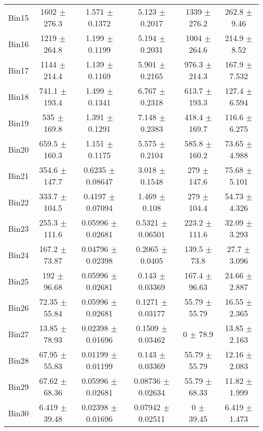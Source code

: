\begin{tabular}{@{\extracolsep{4pt}}lccccc@{}}
     Bin15 & 1602 $\pm$ 276.3 & 1.571 $\pm$ 0.1372 & 5.123 $\pm$ 0.2017 & 1339 $\pm$ 276.2 & 262.8 $\pm$ 9.46 \\ 
     Bin16 & 1219 $\pm$ 264.8 & 1.199 $\pm$ 0.1199 & 5.194 $\pm$ 0.2031 & 1004 $\pm$ 264.6 & 214.9 $\pm$ 8.52 \\ 
     Bin17 & 1144 $\pm$ 214.4 & 1.139 $\pm$ 0.1169 & 5.901 $\pm$ 0.2165 & 976.3 $\pm$ 214.3 & 167.9 $\pm$ 7.532 \\ 
     Bin18 & 741.1 $\pm$ 193.4 & 1.499 $\pm$ 0.1341 & 6.767 $\pm$ 0.2318 & 613.7 $\pm$ 193.3 & 127.4 $\pm$ 6.594 \\ 
     Bin19 & 535 $\pm$ 169.8 & 1.391 $\pm$ 0.1291 & 7.148 $\pm$ 0.2383 & 418.4 $\pm$ 169.7 & 116.6 $\pm$ 6.275 \\ 
     Bin20 & 659.5 $\pm$ 160.3 & 1.151 $\pm$ 0.1175 & 5.575 $\pm$ 0.2104 & 585.8 $\pm$ 160.2 & 73.65 $\pm$ 4.988 \\ 
     Bin21 & 354.6 $\pm$ 147.7 & 0.6235 $\pm$ 0.08647 & 3.018 $\pm$ 0.1548 & 279 $\pm$ 147.6 & 75.68 $\pm$ 5.101 \\ 
     Bin22 & 333.7 $\pm$ 104.5 & 0.4197 $\pm$ 0.07094 & 1.469 $\pm$ 0.108 & 279 $\pm$ 104.4 & 54.73 $\pm$ 4.326 \\ 
     Bin23 & 255.3 $\pm$ 111.6 & 0.05996 $\pm$ 0.02681 & 0.5321 $\pm$ 0.06501 & 223.2 $\pm$ 111.6 & 32.09 $\pm$ 3.293 \\ 
     Bin24 & 167.2 $\pm$ 73.87 & 0.04796 $\pm$ 0.02398 & 0.2065 $\pm$ 0.0405 & 139.5 $\pm$ 73.8 & 27.7 $\pm$ 3.096 \\ 
     Bin25 & 192 $\pm$ 96.68 & 0.05996 $\pm$ 0.02681 & 0.143 $\pm$ 0.03369 & 167.4 $\pm$ 96.63 & 24.66 $\pm$ 2.887 \\ 
     Bin26 & 72.35 $\pm$ 55.84 & 0.05996 $\pm$ 0.02681 & 0.1271 $\pm$ 0.03177 & 55.79 $\pm$ 55.79 & 16.55 $\pm$ 2.365 \\ 
     Bin27 & 13.85 $\pm$ 78.93 & 0.02398 $\pm$ 0.01696 & 0.1509 $\pm$ 0.03462 & 0 $\pm$ 78.9 & 13.85 $\pm$ 2.163 \\ 
     Bin28 & 67.95 $\pm$ 55.83 & 0.01199 $\pm$ 0.01199 & 0.143 $\pm$ 0.03369 & 55.79 $\pm$ 55.79 & 12.16 $\pm$ 2.083 \\ 
     Bin29 & 67.62 $\pm$ 68.36 & 0.05996 $\pm$ 0.02681 & 0.08736 $\pm$ 0.02634 & 55.79 $\pm$ 68.33 & 11.82 $\pm$ 1.999 \\ 
     Bin30 & 6.419 $\pm$ 39.48 & 0.02398 $\pm$ 0.01696 & 0.07942 $\pm$ 0.02511 & 0 $\pm$ 39.45 & 6.419 $\pm$ 1.473 \\ 
\hline\hline
  \end{tabular}
